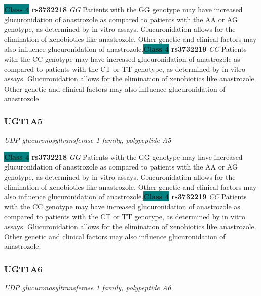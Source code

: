 \documentclass{report}
\begin{document}
\textbf{\colorbox{teal} {Class 4}} \textbf{ rs3732218 } \textit{ GG }
Patients with the GG genotype may have increased glucuronidation of anastrozole as compared to patients with the AA or AG genotype, as determined by in vitro assays. Glucuronidation allows for the elimination of xenobiotics like anastrozole. Other genetic and clinical factors may also influence glucuronidation of anastrozole.\newline\textbf{\colorbox{teal} {Class 4}} \textbf{ rs3732219 } \textit{ CC }
Patients with the CC genotype may have increased glucuronidation of anastrozole as compared to patients with the CT or TT genotype, as determined by in vitro assays. Glucuronidation allows for the elimination of xenobiotics like anastrozole. Other genetic and clinical factors may also influence glucuronidation of anastrozole. \newline\subsubsection{ UGT1A5 }
\textit{ UDP glucuronosyltransferase 1 family, polypeptide A5 }

\textbf{\colorbox{teal} {Class 4}} \textbf{ rs3732218 } \textit{ GG }
Patients with the GG genotype may have increased glucuronidation of anastrozole as compared to patients with the AA or AG genotype, as determined by in vitro assays. Glucuronidation allows for the elimination of xenobiotics like anastrozole. Other genetic and clinical factors may also influence glucuronidation of anastrozole.\newline\textbf{\colorbox{teal} {Class 4}} \textbf{ rs3732219 } \textit{ CC }
Patients with the CC genotype may have increased glucuronidation of anastrozole as compared to patients with the CT or TT genotype, as determined by in vitro assays. Glucuronidation allows for the elimination of xenobiotics like anastrozole. Other genetic and clinical factors may also influence glucuronidation of anastrozole. \newline\subsubsection{ UGT1A6 }
\textit{ UDP glucuronosyltransferase 1 family, polypeptide A6 }
\end{document}
